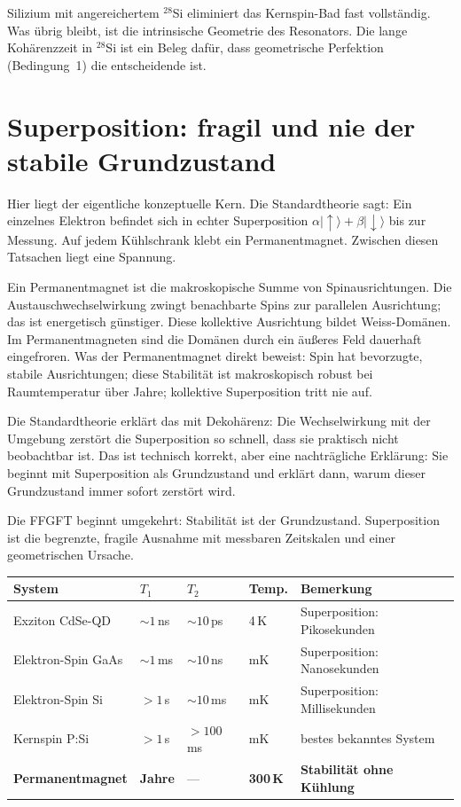 Silizium mit angereichertem ${}^{28}$Si eliminiert das Kernspin-Bad fast
vollständig. Was übrig bleibt, ist die intrinsische Geometrie des
Resonators. Die lange Kohärenzzeit in ${}^{28}$Si ist ein Beleg dafür,
dass geometrische Perfektion (Bedingung~1) die entscheidende ist.

\section{Superposition: fragil und nie der stabile Grundzustand}

Hier liegt der eigentliche konzeptuelle Kern. Die Standardtheorie sagt:
Ein einzelnes Elektron befindet sich in echter Superposition
$\alpha|\uparrow\rangle+\beta|\downarrow\rangle$ bis zur Messung. Auf
jedem Kühlschrank klebt ein Permanentmagnet. Zwischen diesen Tatsachen
liegt eine Spannung.

Ein Permanentmagnet ist die makroskopische Summe von Spinausrichtungen.
Die Austauschwechselwirkung zwingt benachbarte Spins zur parallelen
Ausrichtung; das ist energetisch günstiger. Diese kollektive Ausrichtung
bildet Weiss-Domänen. Im Permanentmagneten sind die Domänen durch ein
äußeres Feld dauerhaft eingefroren. Was der Permanentmagnet direkt
beweist: Spin hat bevorzugte, stabile Ausrichtungen; diese Stabilität
ist makroskopisch robust bei Raumtemperatur über Jahre; kollektive
Superposition tritt nie auf.

Die Standardtheorie erklärt das mit Dekohärenz: Die Wechselwirkung mit
der Umgebung zerstört die Superposition so schnell, dass sie praktisch
nicht beobachtbar ist. Das ist technisch korrekt, aber eine nachträgliche
Erklärung: Sie beginnt mit Superposition als Grundzustand und erklärt
dann, warum dieser Grundzustand immer sofort zerstört wird.

Die FFGFT beginnt umgekehrt: Stabilität ist der Grundzustand.
Superposition ist die begrenzte, fragile Ausnahme mit messbaren
Zeitskalen und einer geometrischen Ursache.

\begin{center}
\small
\begin{tabular}{p{3.2cm}p{1.3cm}p{1.3cm}p{1.3cm}p{2.3cm}}
\toprule
\textbf{System} & \textbf{$T_1$} & \textbf{$T_2$} & \textbf{Temp.} & \textbf{Bemerkung} \\
\midrule
Exziton CdSe-QD & $\sim1$\,ns & $\sim10$\,ps & 4\,K & Superposition: Pikosekunden \\
Elektron-Spin GaAs & $\sim1$\,ms & $\sim10$\,ns & mK & Superposition: Nanosekunden \\
Elektron-Spin Si & $>1$\,s & $\sim10$\,ms & mK & Superposition: Millisekunden \\
Kernspin P:Si & $>1$\,s & $>100$\,ms & mK & bestes bekanntes System \\
\textbf{Permanentmagnet} & \textbf{Jahre} & --- & \textbf{300\,K} & \textbf{Stabilität ohne Kühlung} \\
\bottomrule
\end{tabular}
\end{center}

